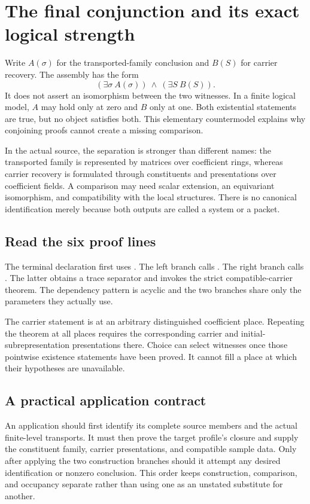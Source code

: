 \clearpage
\section{The final conjunction and its exact logical strength}
\label{sec:assembly}
Write $A(\sigma)$ for the transported-family conclusion and $B(S)$ for carrier
recovery. The assembly has the form
\[
 (\exists\sigma\ A(\sigma))\ \wedge\ (\exists S\ B(S)).
\]
It does not assert an isomorphism between the two witnesses. In a finite logical
model, $A$ may hold only at zero and $B$ only at one. Both existential statements
are true, but no object satisfies both. This elementary countermodel explains
why conjoining proofs cannot create a missing comparison.

In the actual source, the separation is stronger than different names: the
transported family is represented by matrices over coefficient rings, whereas
carrier recovery is formulated through constituents and presentations over
coefficient fields. A comparison may need scalar extension, an equivariant
isomorphism, and compatibility with the local structures. There is no canonical
identification merely because both outputs are called a system or a packet.

\subsection{Read the six proof lines}
The terminal declaration first uses . The left branch calls
. The right branch calls
. The latter obtains a trace
separator and invokes the strict compatible-carrier theorem. The dependency
pattern is acyclic and the two branches share only the parameters they actually use.

The carrier statement is at an arbitrary distinguished coefficient place.
Repeating the theorem at all places requires the corresponding carrier and
initial-subrepresentation presentations there. Choice can select witnesses once
those pointwise existence statements have been proved. It cannot fill a place
at which their hypotheses are unavailable.

\subsection{A practical application contract}
An application should first identify its complete source members and the actual
finite-level transports. It must then prove the target profile's closure and
supply the constituent family, carrier presentations, and compatible sample data.
Only after applying the two construction branches should it attempt any desired
identification or nonzero conclusion. This order keeps construction, comparison,
and occupancy separate rather than using one as an unstated substitute for another.

